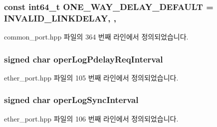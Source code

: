 \subsubsection[{\texorpdfstring{O\+N\+E\+\_\+\+W\+A\+Y\+\_\+\+D\+E\+L\+A\+Y\+\_\+\+D\+E\+F\+A\+U\+LT}{ONE_WAY_DELAY_DEFAULT}}]{\setlength{\rightskip}{0pt plus 5cm}const {\bf int64\+\_\+t} O\+N\+E\+\_\+\+W\+A\+Y\+\_\+\+D\+E\+L\+A\+Y\+\_\+\+D\+E\+F\+A\+U\+LT = {\bf I\+N\+V\+A\+L\+I\+D\+\_\+\+L\+I\+N\+K\+D\+E\+L\+AY}\hspace{0.3cm}{\ttfamily [static]}, {\ttfamily [protected]}, {\ttfamily [inherited]}}\hypertarget{class_common_port_a1b98444ef2ff94e8f85b04c61cf42f56}{}\label{class_common_port_a1b98444ef2ff94e8f85b04c61cf42f56}


common\+\_\+port.\+hpp 파일의 364 번째 라인에서 정의되었습니다.

\subsubsection[{\texorpdfstring{oper\+Log\+Pdelay\+Req\+Interval}{operLogPdelayReqInterval}}]{\setlength{\rightskip}{0pt plus 5cm}signed char oper\+Log\+Pdelay\+Req\+Interval\hspace{0.3cm}{\ttfamily [private]}}\hypertarget{class_ether_port_a3062b4f36651db612ae70061510ccefb}{}\label{class_ether_port_a3062b4f36651db612ae70061510ccefb}


ether\+\_\+port.\+hpp 파일의 105 번째 라인에서 정의되었습니다.

\subsubsection[{\texorpdfstring{oper\+Log\+Sync\+Interval}{operLogSyncInterval}}]{\setlength{\rightskip}{0pt plus 5cm}signed char oper\+Log\+Sync\+Interval\hspace{0.3cm}{\ttfamily [private]}}\hypertarget{class_ether_port_a5b06dd259daf4e1dd5c6b8d15f9bcabf}{}\label{class_ether_port_a5b06dd259daf4e1dd5c6b8d15f9bcabf}


ether\+\_\+port.\+hpp 파일의 106 번째 라인에서 정의되었습니다.

